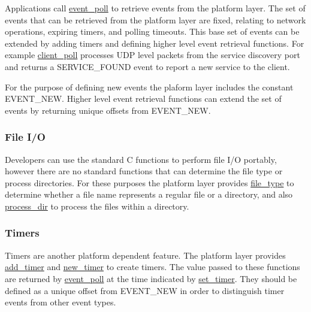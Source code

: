 Applications call \hyperlink{group__event_gaab7ac3049413d657bde5b7a6ae33c128}{event\+\_\+poll} to retrieve events from the platform layer. The set of events that can be retrieved from the platform layer are fixed, relating to network operations, expiring timers, and polling timeouts. This base set of events can be extended by adding timers and defining higher level event retrieval functions. For example \hyperlink{group__client_ga7c5c3327618a1b3c4757c415fb42ba8d}{client\+\_\+poll} processes U\+DP level packets from the service discovery port and returns a {\ttfamily S\+E\+R\+V\+I\+C\+E\+\_\+\+F\+O\+U\+ND} event to report a new service to the client.

For the purpose of defining new events the plaform layer includes the constant {\ttfamily E\+V\+E\+N\+T\+\_\+\+N\+EW}. Higher level event retrieval functions can extend the set of events by returning unique offsets from {\ttfamily E\+V\+E\+N\+T\+\_\+\+N\+EW}.

\subsubsection*{File I/O}

Developers can use the standard C functions to perform file I/O portably, however there are no standard functions that can determine the file type or process directories. For these purposes the platform layer provides \hyperlink{group__file_ga2fc3c2a4230816bcc6c264a334d62c3c}{file\+\_\+type} to determine whether a file name represents a regular file or a directory, and also \hyperlink{group__file_ga3d464d8bbd8ca54a1686258319f5eeb3}{process\+\_\+dir} to process the files within a directory.

\subsubsection*{Timers}

Timers are another platform dependent feature. The platform layer provides \hyperlink{group__timer_ga0aaa8477c77e036e7f41f7704721b9f7}{add\+\_\+timer} and \hyperlink{group__timer_gab1f067b2c41862d5cf2a06ca8a5359da}{new\+\_\+timer} to create timers. The value passed to these functions are returned by \hyperlink{group__event_gaab7ac3049413d657bde5b7a6ae33c128}{event\+\_\+poll} at the time indicated by \hyperlink{group__timer_gacbdc140f686e71964beb4e5608313b5b}{set\+\_\+timer}. They should be defined as a unique offset from {\ttfamily E\+V\+E\+N\+T\+\_\+\+N\+EW} in order to distinguish timer events from other event types.

